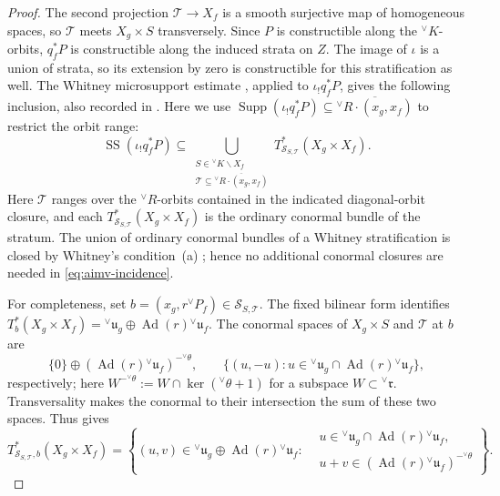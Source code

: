 \documentclass[10pt]{amsart}
\numberwithin{equation}{section}
\theoremstyle{plain}
\theoremstyle{definition}
\theoremstyle{remark}
\newcommand{\fr}{\mathfrak r}
\newcommand{\fu}{\mathfrak u}
\newcommand{\vR}{{}^{\vee}R}
\newcommand{\vK}{{}^{\vee}K}
\newcommand{\vP}{{}^{\vee}P}
\newcommand{\vfr}{{}^{\vee}\fr}
\newcommand{\vfu}{{}^{\vee}\fu}
\newcommand{\vtheta}{{}^{\vee}\theta}
\newcommand{\SSupp}{\operatorname{SS}}
\begin{document}
\begin{proof}
The second projection
$\mathcal T\to X_f$ is a smooth surjective map of homogeneous spaces,
so $\mathcal T$ meets $X_g\times S$ transversely. Since $P$ is
constructible along the $\vK$-orbits, $q_f^*P$ is constructible along
the induced strata on $Z$. The image of $\iota$ is a union of strata,
so its extension by zero is constructible for this stratification as well.
The Whitney microsupport estimate
\cite[Proposition~4.8]{GPS23}, applied to $\iota_!q_f^*P$, gives
the following inclusion, also recorded in \cite[(4.6.5)]{AIMV26}.
Here we use
$\operatorname{Supp}(\iota_!q_f^*P)\subseteq
\overline{\vR\cdot(x_g,x_f)}$ to restrict the orbit range:
\begin{equation}\label{eq:aimv-incidence}
 \SSupp(\iota_!q_f^*P)
 \subseteq
 \bigcup_{\substack{S\in\vK\backslash X_f\\
 \mathcal T\subseteq\overline{\vR\cdot(x_g,x_f)}}}
 T^*_{\mathcal S_{S,\mathcal T}}(X_g\times X_f)
 .
\end{equation}
Here $\mathcal T$ ranges over the $\vR$-orbits contained in the indicated
diagonal-orbit closure, and each
$T^*_{\mathcal S_{S,\mathcal T}}(X_g\times X_f)$ is the ordinary conormal
bundle of the stratum.
The union of ordinary conormal bundles of a Whitney stratification
is closed by Whitney's condition~(a)
\cite[Section~2.1]{GPS23}; hence no additional conormal closures
are needed in \eqref{eq:aimv-incidence}.

For completeness, set $b=(x_g,r\vP_f)\in\mathcal S_{S,\mathcal T}$.
The fixed bilinear form identifies
$T_b^*(X_g\times X_f)=\vfu_g\oplus\operatorname{Ad}(r)\vfu_f$.
The conormal spaces of $X_g\times S$ and $\mathcal T$ at $b$ are
\[
 \{0\}\oplus(\operatorname{Ad}(r)\vfu_f)^{-\vtheta},
 \qquad
 \{(u,-u):u\in\vfu_g\cap\operatorname{Ad}(r)\vfu_f\},
\]
respectively; here $W^{-\vtheta}:=W\cap\ker(\vtheta+1)$ for a
subspace $W\subset\vfr$. Transversality makes the conormal to their
intersection the sum of these two spaces. Thus
\cite[(4.6.6)--(4.6.8)]{AIMV26} gives
\begin{equation}\label{eq:incidence-conormal-fiber}
 T^*_{\mathcal S_{S,\mathcal T},b}(X_g\times X_f)
 =\left\{(u,v)\in\vfu_g\oplus\operatorname{Ad}(r)\vfu_f:
 \begin{aligned}
 &u\in\vfu_g\cap\operatorname{Ad}(r)\vfu_f,\\
 &u+v\in(\operatorname{Ad}(r)\vfu_f)^{-\vtheta}
 \end{aligned}\right\}.
\end{equation}


\end{proof}
\end{document}
